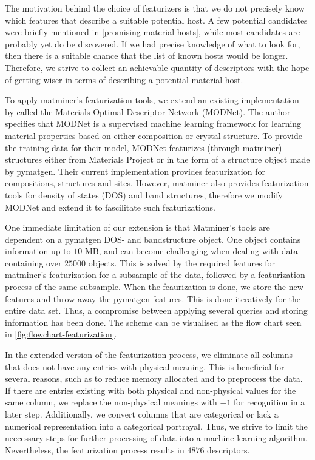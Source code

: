 The motivation behind the choice of featurizers is that we do not precisely know which features that describe a suitable potential host. A few potential candidates were briefly mentioned in \autoref{promising-material-hosts}, while most candidates are probably yet do be discovered. If we  had precise knowledge of what to look for, then there is a suitable chance that the list of known hosts would be longer. Therefore, we strive to collect an achievable quantity of descriptors with the hope of getting wiser in terms of describing a potential material host.

To apply matminer's featurization tools, we extend an existing implementation by \citeauthor{Breuck2021} \cite{Breuck2021} called the Materials Optimal Descriptor Network (MODNet). The author \citeauthor{Breuck2021} specifies that MODNet is a supervised machine learning framework for learning material properties based on either composition or crystal structure. To provide the training data for their model, MODNet featurizes (through matminer) structures either from Materials Project or in the form of a structure object made by pymatgen. Their current implementation provides featurization for compositions, structures and sites. However, matminer also provides featurization tools for density of states (DOS) and band structures, therefore we modify MODNet and extend it to fascilitate such featurizations.



\noindent One immediate limitation of our extension is that Matminer's tools are dependent on a pymatgen DOS- and bandstructure object. One object contains information up to $10$ MB, and can become challenging when dealing with data containing over $25000$ objects. This is solved by the required features for matminer's featurization for a subsample of the data, followed by a featurization process of the same subsample. When the feaurization is done, we store the new features and throw away the pymatgen features. This is done iteratively for the entire data set. Thus, a compromise between applying several queries and storing information has been done. The scheme can be visualised as the flow chart seen in \autoref{fig:flowchart-featurization}.

In the extended version of the featurization process, we eliminate all columns that does not have any entries with physical meaning. This is beneficial for several reasons, such as to reduce memory allocated and to preprocess the data. If there are entries existing with both physical and non-physical values for the same column, we replace the non-physical meanings with $-1$ for recognition in a later step. Additionally, we convert columns that are categorical or lack a numerical representation into a categorical portrayal. Thus, we strive to limit the neccessary steps for further processing of data into a machine learning algorithm. Nevertheless, the featurization process results in $4876$ descriptors.

